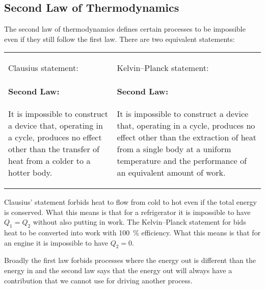     \subsection{Second Law of Thermodynamics}
    The second law of thermodynamics defines certain processes to be impossible even if they still follow the first law.
    There are two equivalent statements:
    \begin{center}
        \begin{tabular}{p{}p{}}
            Clausius statement:
            \paragraph{Second Law:} It is impossible to construct a device that, operating in a cycle, produces no effect other than the transfer of heat from a colder to a hotter body. &
            
            Kelvin--Planck statement:
            \paragraph{Second Law:} It is impossible to construct a device that, operating in a cycle, produces no effect other than the extraction of heat from a single body at a uniform temperature and the performance of an equivalent amount of work.
        \end{tabular}
    \end{center}

    Clausius' statement forbids heat to flow from cold to hot even if the total energy is conserved.
    What this means is that for a refrigerator it is impossible to have \(Q_1 = Q_2\) without also putting in work.
    The Kelvin--Planck statement for bids heat to be converted into work with \SI{100}{\percent} efficiency.
    What this means is that for an engine it is impossible to have \(Q_2 = 0\).
    
    Broadly the first law forbids processes where the energy out is different than the energy in and the second law says that the energy out will always have a contribution that we cannot use for driving another process.
    
